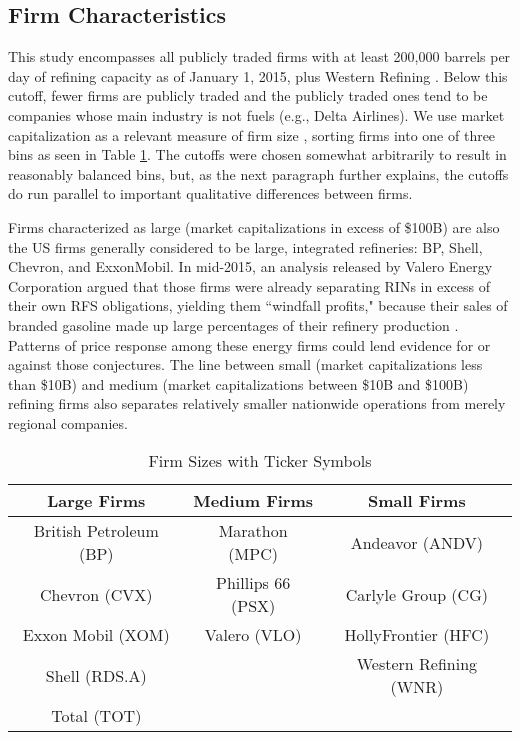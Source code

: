 \documentclass[11pt]{article}
\begin{document}
\subsection{Firm Characteristics}\label{sec_firmcharacter}
This study encompasses all publicly traded firms with at least 200,000 barrels per day of refining capacity as of January 1, 2015, plus Western Refining \citep{EnergyInformationAdministration2015}. Below this cutoff, fewer firms are publicly traded and the publicly traded ones tend to be companies whose main industry is not fuels (e.g., Delta Airlines). We use market capitalization as a relevant measure of firm size \citep{Fama1992}, sorting firms into one of three bins as seen in Table \ref{bins}. The cutoffs were chosen somewhat arbitrarily to result in reasonably balanced bins, but, as the next paragraph further explains, the cutoffs do run parallel to important qualitative differences between firms.

Firms characterized as large (market capitalizations in excess of \$100B) are also the US firms generally considered to be large, integrated refineries: BP, Shell, Chevron, and ExxonMobil. In mid-2015, an analysis released by Valero Energy Corporation argued that those firms were already separating RINs in excess of their own RFS obligations, yielding them ``windfall profits," because their sales of branded gasoline made up large percentages of their refinery production \citep{ValeroEnergyCorporation2016}. Patterns of price response among these energy firms could lend evidence for or against those conjectures. The line between small (market capitalizations less than \$10B) and medium (market capitalizations between \$10B and \$100B) refining firms also separates relatively smaller nationwide operations from merely regional companies. 

\begin{table}[h]
	\caption{Firm Sizes with Ticker Symbols}
	\label{bins}
	\centering
	
		\begin{tabular}{c c c }
			\hline
			\hline
			Large Firms		& Medium Firms	& Small Firms\\
			\hline
			British Petroleum (BP) & Marathon (MPC) & Andeavor (ANDV)\\
			Chevron (CVX) & Phillips 66 (PSX) & Carlyle Group (CG)\\
			Exxon Mobil (XOM) & Valero (VLO) & HollyFrontier (HFC)\\
			Shell (RDS.A) & & Western Refining (WNR)\\
			Total (TOT) & & \\
			\hline
			
		\end{tabular}
	
\end{table}
\end{document}
